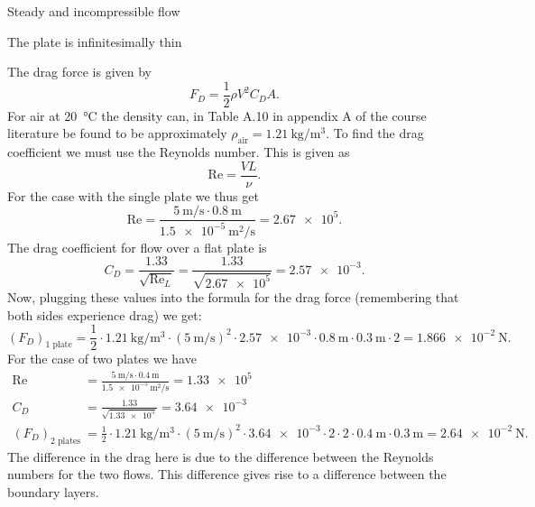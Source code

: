 \begin{assumptions}
  \item Steady and incompressible flow
  \item The plate is infinitesimally thin
\end{assumptions}

\begin{derivation}
  The drag force is given by
  \begin{equation*}
    F_D = \frac{1}{2}\rho V^2 C_D A
  .\end{equation*}
  For air at \qty{20}{\celsius} the density can, in Table A.10 in appendix A of the course literature be found to be approximately $\rho_{\text{air}} = \qty{1,21}{\kg\per\cubic\m}$.
  To find the drag coefficient we must use the Reynolds number.
  This is given as
  \begin{equation*}
    \mathrm{Re} = \frac{V L}{\nu}
  .\end{equation*}
  For the case with the single plate we thus get
  \begin{equation*}
    \mathrm{Re} = \frac{\qty{5}{\m\per\s} \cdot \qty{0,8}{\m}}{\qty{1,5e-5}{\m\squared\per\s} } = \num{2,67e5} 
  .\end{equation*}
  The drag coefficient for flow over a flat plate is
  \begin{equation*}
    C_D = \frac{\num{1,33} }{\sqrt{\mathrm{Re}_L}} = \frac{\num{1,33} }{\sqrt{\num{2,67e5} }} = \num{2,57e-3}
  .\end{equation*}
  Now, plugging these values into the formula for the drag force (remembering that both sides experience drag) we get:
  \begin{equation*}
    \left( F_D \right)_{\text{1 plate}} = \frac{1}{2} \cdot \qty{1,21}{\kg\per\cubic\m} \cdot  \left( \qty{5}{\m\per\s}  \right)^2 \cdot \num{2,57e-3} \cdot \qty{0,8}{\m} \cdot \qty{0,3}{\m} \cdot 2 = \qty{1,866e-2}{\N} 
  .\end{equation*}
  For the case of two plates we have
  \begin{align*}
    \mathrm{Re} &= \frac{\qty{5}{\m\per\s} \cdot \qty{0,4}{\m} }{\qty{1,5e-5}{\square\m\per\s} } = \num{1,33e5}  \\
    C_D &= \frac{\num{1,33}}{\sqrt{\num{1,33e5}}}= \num{3,64e-3}  \\
    \left( F_D \right)_{\text{2 plates}} &= \frac{1}{2} \cdot \qty{1,21}{\kg\per\cubic\m} \cdot \left( \qty{5}{\m\per\s}  \right)^2 \cdot \num{3,64e-3} \cdot 2 \cdot 2 \cdot \qty{0,4}{\m} \cdot \qty{0,3}{\m} = \qty{2,64e-2}{\N} 
  .\end{align*}
  The difference in the drag here is due to the difference between the Reynolds numbers for the two flows.
  This difference gives rise to a difference between the boundary layers.
\end{derivation}

